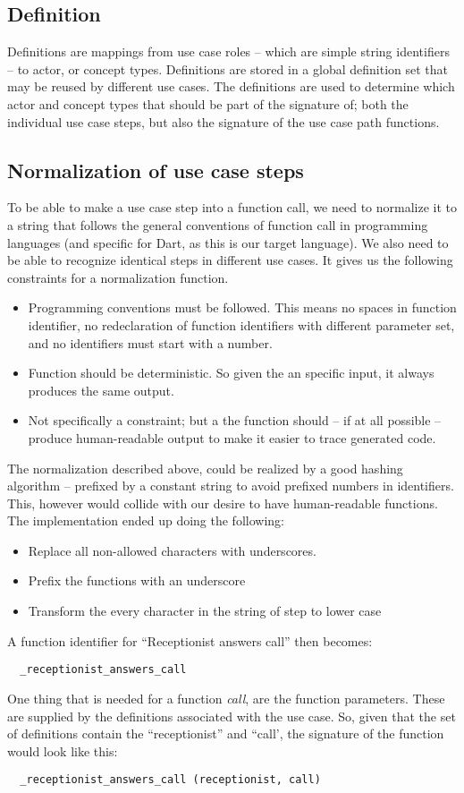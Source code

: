 \subsection{Definition}
Definitions are mappings from use case roles -- which are simple string identifiers -- to actor, or concept types. Definitions are stored in a global definition set that may be reused by different use cases. The definitions are used to determine which actor and concept types that should be part of the signature of; both the individual use case steps, but also the signature of the use case path functions.

\subsection{Normalization of use case steps}
To be able to make a use case step into a function call, we need to normalize it to a string that follows the general conventions of function call in programming languages (and specific for Dart, as this is our target language). We also need to be able to recognize identical steps in different use cases. It gives us the following constraints for a normalization function.
\begin{itemize}
  \item Programming conventions must be followed. This means no spaces in function identifier, no redeclaration of function identifiers with different parameter set, and no identifiers must start with a number.
  \item Function should be deterministic. So given the an specific input, it always produces the same output.
  \item Not specifically a constraint; but a the function should -- if at all possible -- produce human-readable output to make it easier to trace generated code.
\end{itemize}
The normalization described above, could be realized by a good hashing algorithm -- prefixed by a constant string to avoid prefixed numbers in identifiers. This, however would collide with our desire to have human-readable functions. The implementation ended up doing the following:
\begin{itemize}
  \item Replace all non-allowed characters with underscores.
  \item Prefix the functions with an underscore
  \item Transform the every character in the string of step to lower case
\end{itemize}
A function identifier for ``Receptionist answers call'' then becomes:
\begin{verbatim}
  _receptionist_answers_call
\end{verbatim}
One thing that is needed for a function \emph{call}, are the function parameters. These are supplied by the definitions associated with the use case. So, given that the set of definitions contain the ``receptionist'' and ``call', the signature of the function would look like this:
\begin{verbatim}
  _receptionist_answers_call (receptionist, call)
\end{verbatim}

